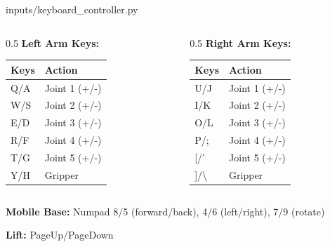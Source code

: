 \begin{frame}{inputs/keyboard\_controller.py}
\begin{columns}
\begin{column}{0.5\textwidth}
    \textbf{Left Arm Keys:}
    \begin{table}
    \centering
    \footnotesize
    \begin{tabular}{ll}
    \toprule
    \textbf{Keys} & \textbf{Action} \\
    \midrule
    Q/A & Joint 1 (+/-) \\
    W/S & Joint 2 (+/-) \\
    E/D & Joint 3 (+/-) \\
    R/F & Joint 4 (+/-) \\
    T/G & Joint 5 (+/-) \\
    Y/H & Gripper \\
    \bottomrule
    \end{tabular}
    \end{table}
\end{column}
\begin{column}{0.5\textwidth}
    \textbf{Right Arm Keys:}
    \begin{table}
    \centering
    \footnotesize
    \begin{tabular}{ll}
    \toprule
    \textbf{Keys} & \textbf{Action} \\
    \midrule
    U/J & Joint 1 (+/-) \\
    I/K & Joint 2 (+/-) \\
    O/L & Joint 3 (+/-) \\
    P/; & Joint 4 (+/-) \\
    {[}/' & Joint 5 (+/-) \\
    {]}/\textbackslash & Gripper \\
    \bottomrule
    \end{tabular}
    \end{table}
\end{column}
\end{columns}

\vspace{0.3cm}

\textbf{Mobile Base:} Numpad 8/5 (forward/back), 4/6 (left/right), 7/9 (rotate)

\textbf{Lift:} PageUp/PageDown
\end{frame}

